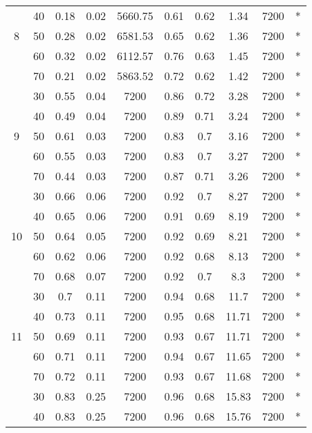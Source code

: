 \documentclass{itor}
\theoremstyle{definition}
\theoremstyle{remark}
\begin{document}
\begin{table}[htbp]
\begin{tabular}{|c|c|cccc|cccc|}
          & 40    & 0.18  & 0.02  & 5660.75 & 0.61  & 0.62  & 1.34  & 7200  & * \\
    8     & 50    & 0.28  & 0.02  & 6581.53 & 0.65  & 0.62  & 1.36  & 7200  & * \\
          & 60    & 0.32  & 0.02  & 6112.57 & 0.76  & 0.63  & 1.45  & 7200  & * \\
          & 70    & 0.21  & 0.02  & 5863.52 & 0.72  & 0.62  & 1.42  & 7200  & * \\
    \midrule
          & 30    & 0.55  & 0.04  & 7200  & 0.86  & 0.72  & 3.28  & 7200  & * \\
          & 40    & 0.49  & 0.04  & 7200  & 0.89  & 0.71  & 3.24  & 7200  & * \\
    9     & 50    & 0.61  & 0.03  & 7200  & 0.83  & 0.7   & 3.16  & 7200  & * \\
          & 60    & 0.55  & 0.03  & 7200  & 0.83  & 0.7   & 3.27  & 7200  & * \\
          & 70    & 0.44  & 0.03  & 7200  & 0.87  & 0.71  & 3.26  & 7200  & * \\
    \midrule
          & 30    & 0.66  & 0.06  & 7200  & 0.92  & 0.7   & 8.27  & 7200  & * \\
          & 40    & 0.65  & 0.06  & 7200  & 0.91  & 0.69  & 8.19  & 7200  & * \\
    10    & 50    & 0.64  & 0.05  & 7200  & 0.92  & 0.69  & 8.21  & 7200  & * \\
          & 60    & 0.62  & 0.06  & 7200  & 0.92  & 0.68  & 8.13  & 7200  & * \\
          & 70    & 0.68  & 0.07  & 7200  & 0.92  & 0.7   & 8.3   & 7200  & * \\
    \midrule
          & 30    & 0.7   & 0.11  & 7200  & 0.94  & 0.68  & 11.7  & 7200  & * \\
          & 40    & 0.73  & 0.11  & 7200  & 0.95  & 0.68  & 11.71 & 7200  & * \\
    11    & 50    & 0.69  & 0.11  & 7200  & 0.93  & 0.67  & 11.71 & 7200  & * \\
          & 60    & 0.71  & 0.11  & 7200  & 0.94  & 0.67  & 11.65 & 7200  & * \\
          & 70    & 0.72  & 0.11  & 7200  & 0.93  & 0.67  & 11.68 & 7200  & * \\
    \midrule
          & 30    & 0.83  & 0.25  & 7200  & 0.96  & 0.68  & 15.83 & 7200  & * \\
          & 40    & 0.83  & 0.25  & 7200  & 0.96  & 0.68  & 15.76 & 7200  & * \\

\end{tabular}
\end{table}
\end{document}

